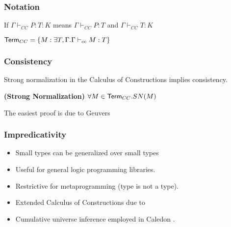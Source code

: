 \begin{frame}

\frametitle{Notation}

\begin{definition}
If $\Gamma \vdash_{CC} P : T : K$ means $\Gamma \vdash_{CC} P : T$ and $\Gamma \vdash_{CC} T : K$
\end{definition}


\begin{definition}
$ \mathsf{Term}_{CC}  = \{ M : \exists T,\Gamma . \Gamma \vdash_{cc} M : T \}$
\end{definition}

\end{frame}


\begin{frame}
\frametitle{Consistency}

Strong normalization in the Calculus of Constructions implies consistency.

\begin{theorem}
\textbf{(Strong Normalization)} $\forall M \in \mathsf{Term}_{CC}. SN(M)$
\label{cc:cons}
\end{theorem}

The easiest proof is due to Geuvers \citep{Geuvers94ashort} 

\end{frame}


\begin{frame}
\frametitle{Impredicativity}

\begin{itemize}
\item Small types can be generalized over small types
\item Useful for general logic programming libraries.
\item Restrictive for metaprogramming (type is not a type).
\item Extended Calculus of Constructions due to \citet{luo1989ecc} 
\item Cumulative universe inference employed in Caledon \citep{callaghan2001implementation}.
\end{itemize}

\end{frame}


